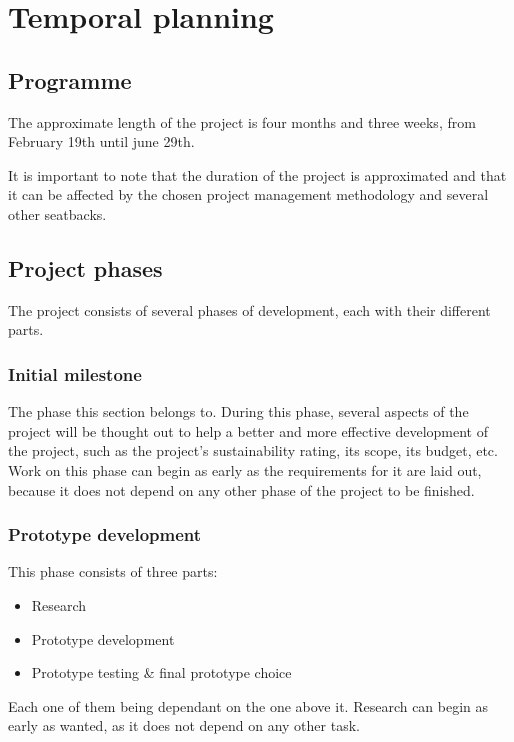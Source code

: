 \chapter{Temporal planning}

\section{Programme}

The approximate length of the project is four months and three weeks, from 
February 19th until june 29th.

It is important to note that the duration of the project is approximated
and that it can be affected by the chosen project management methodology
and several other seatbacks.

\section{Project phases}

The project consists of several phases of development, each with their
different parts.

\subsection{Initial milestone}\label{initial}

The phase this section belongs to. During this phase, several aspects of the project will be thought out to help a better and more effective development of the project, such as the project's sustainability rating, its scope, its budget, etc. Work on this phase can begin as early as the requirements for it are laid out, because it does not depend on any other phase of the project to be finished.

\subsection{Prototype development}

This phase consists of three parts:

\begin{itemize}
    \item Research
    \item Prototype development
    \item Prototype testing \& final prototype choice 
\end{itemize}

Each one of them being dependant on the one above it. Research can begin as early as wanted, as it does not depend on any other task.

